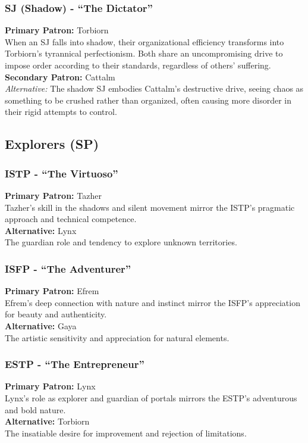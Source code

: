 \documentclass[a4paper,twoside,openany]{book}
\begin{document}
\begin{multicols}{2}
	\subsubsection*{SJ (Shadow) - ``The Dictator''}
	\textbf{Primary Patron:} Torbiorn\\
	When an SJ falls into shadow, their organizational efficiency transforms into Torbiorn's tyrannical perfectionism. Both share an uncompromising drive to impose order according to their standards, regardless of others' suffering.\\
	\textbf{Secondary Patron:} Cattalm\\
	\textit{Alternative:} The shadow SJ embodies Cattalm's destructive drive, seeing chaos as something to be crushed rather than organized, often causing more disorder in their rigid attempts to control.

	\subsection*{Explorers (SP)}
	\subsubsection*{ISTP - ``The Virtuoso''}
	\textbf{Primary Patron:} Tazher\\
	Tazher's skill in the shadows and silent movement mirror the ISTP's pragmatic approach and technical competence.\\
	\textbf{Alternative:} Lynx\\
	The guardian role and tendency to explore unknown territories.

	\subsubsection*{ISFP - ``The Adventurer''}
	\textbf{Primary Patron:} Efrem\\
	Efrem's deep connection with nature and instinct mirror the ISFP's appreciation for beauty and authenticity.\\
	\textbf{Alternative:} Gaya\\
	The artistic sensitivity and appreciation for natural elements.

	\subsubsection*{ESTP - ``The Entrepreneur''}
	\textbf{Primary Patron:} Lynx\\
	Lynx's role as explorer and guardian of portals mirrors the ESTP's adventurous and bold nature.\\
	\textbf{Alternative:} Torbiorn\\
	The insatiable desire for improvement and rejection of limitations.


\end{multicols}
\end{document}
